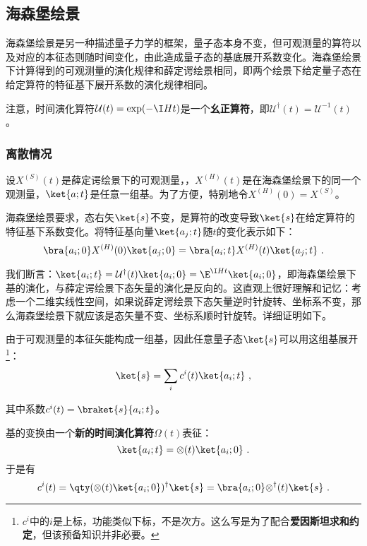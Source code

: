 \subsection{海森堡绘景}

海森堡绘景是另一种描述量子力学的框架，量子态本身不变，但可观测量的算符以及对应的本征态则随时间变化，由此造成量子态的基底展开系数变化。海森堡绘景下计算得到的可观测量的演化规律和薛定谔绘景相同，即两个绘景下给定量子态在给定算符的特征基下展开系数的演化规律相同。

注意，时间演化算符$\mathcal{U}(t)=\exp(-\I Ht)$是一个\textbf{幺正算符}，即$\mathcal{U}^\dagger(t)=\mathcal{U}^{-1}(t)$。

\subsubsection{离散情况}



设$X^{(S)}(t)$是薛定谔绘景下的可观测量，，$X^{(H)}(t)$是在海森堡绘景下的同一个观测量，$\ket{a; t}$是任意一组基。为了方便，特别地令$X^{(H)}(0)=X^{(S)}$。


海森堡绘景要求，态右矢$\ket{s}$不变，是算符的改变导致$\ket{s}$在给定算符的特征基下系数变化。将特征基向量$\ket{a_j; t}$随$t$的变化表示如下：
\begin{equation}\label{eq_HsbPic_16}
\bra{a_i; 0}X^{(H)}(0)\ket{a_j; 0} = \bra{a_i; t}X^{(H)}(t)\ket{a_j; t}~.
\end{equation}

我们断言：$\ket{a_i; t} = \mathcal{U}^\dagger(t)\ket{a_i; 0} = \E^{\I H t}\ket{a_i; 0}$，即海森堡绘景下基的演化，与薛定谔绘景下态矢量的演化是反向的。这直观上很好理解和记忆：考虑一个二维实线性空间，如果说薛定谔绘景下态矢量逆时针旋转、坐标系不变，那么海森堡绘景下就应该是态矢量不变、坐标系顺时针旋转。详细证明如下。

由于可观测量的本征矢能构成一组基，因此任意量子态$\ket{s}$可以用这组基展开\footnote{$c^i$中的$i$是上标，功能类似下标，不是次方。这么写是为了配合\textbf{爱因斯坦求和约定}，但该预备知识并非必要。}：
\begin{equation}\label{eq_HsbPic_12}
\ket{s} = \sum_i c^i(t)\ket{a_i; t}~,
\end{equation}

其中系数$c^i(t)=\braket{s}{a_i; t}$。


基的变换由一个\textbf{新的时间演化算符}$\mathcal{\Omega}(t)$表征：
\begin{equation}\label{eq_HsbPic_13}
\ket{a_i; t} = \mathcal{\Omega}(t)\ket{a_i; 0}~.
\end{equation}
于是有
\begin{equation}\label{eq_HsbPic_14}
c^i(t) = \qty(\mathcal{\Omega}(t)\ket{a_i; 0})^\dagger\ket{s} = \bra{a_i; 0}\mathcal{\Omega}^\dagger(t)\ket{s}~.
\end{equation}

